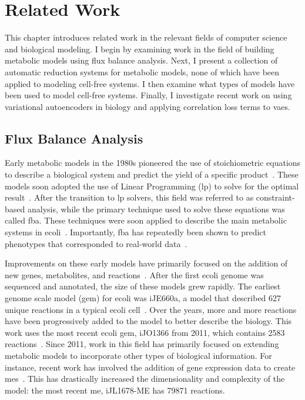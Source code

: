 \chapter{Related Work} \label{chap:rw}
This chapter introduces related work in the relevant fields of computer science and biological modeling.
I begin by examining work in the field of building metabolic models using flux balance analysis.
Next, I present a collection of automatic reduction systems for metabolic models, none of which have been applied to modeling cell-free systems.
I then examine what types of models have been used to model cell-free systems.
Finally, I investigate recent work on using variational autoencoders in biology and applying correlation loss terms to \glspl{vae}.

\section{Flux Balance Analysis}
Early metabolic models in the 1980s pioneered the use of stoichiometric equations to describe a biological system and predict the yield of a specific product~\cite{papoutsakis1984equations}.
These models soon adopted the use of Linear Programming (\gls{lp}) to solve for the optimal result~\cite{fell1986fat}.
After the transition to \gls{lp} solvers, this field was referred to as constraint-based analysis, while the primary technique used to solve these equations was called \gls{fba}.
These techniques were soon applied to describe the main metabolic systems in \gls{ecoli}~\cite{majewski1990simple}.
Importantly, \gls{fba} has repeatedly been shown to predict phenotypes that corresponded to real-world data~\cite{varma1994stoichiometric, edwards2001silico, segre2002analysis, bordbar2014constraint}.

Improvements on these early models have primarily focused on the addition of new genes, metabolites, and reactions~\cite{varma1993metabolic}.
After the first \gls{ecoli} genome was sequenced and annotated, the size of these models grew rapidly.
The earliest genome scale model (\gls{gem}) for \gls{ecoli} was iJE660a, a model that described 627 unique reactions in a typical \gls{ecoli} cell~\cite{edwards2000escherichia}.
Over the years, more and more reactions have been progressively added to the model to better describe the biology.
This work uses the most recent \gls{ecoli} \gls{gem}, iJO1366 from 2011, which contains 2583 reactions~\cite{orth2011comprehensive}.
Since 2011, work in this field has primarily focused on extending metabolic models to incorporate other types of biological information.
For instance, recent work has involved the addition of gene expression data to create \glspl{me}~\cite{lloyd2017cobrame}.
This has drastically increased the dimensionality and complexity of the model: the most recent \gls{me}, iJL1678-ME has 79871 reactions.

